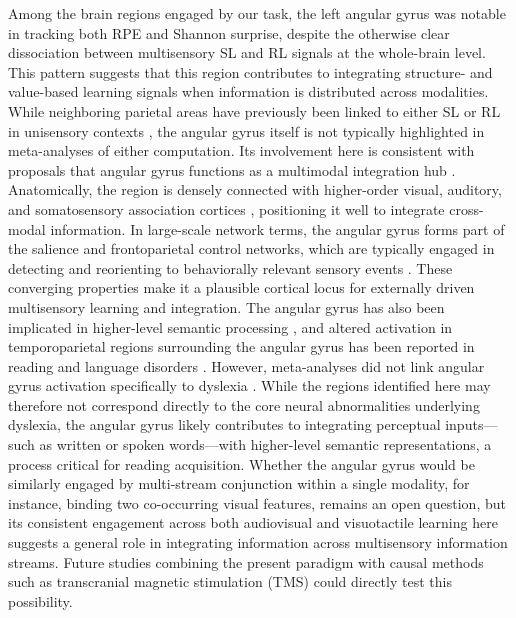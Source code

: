 \documentclass{article}
\begin{document}
Among the brain regions engaged by our task, the left angular gyrus was notable in tracking both RPE and Shannon surprise, despite the otherwise clear dissociation between multisensory SL and RL signals at the whole-brain level. This pattern suggests that this region contributes to integrating structure- and value-based learning signals when information is distributed across modalities. While neighboring parietal areas have previously been linked to either SL or RL in unisensory contexts \cite{visalli2019bayesian, o2013dissociable}, the angular gyrus itself is not typically highlighted in meta-analyses of either computation. Its involvement here is consistent with proposals that angular gyrus functions as a multimodal integration hub \cite{seghier2013angular}. Anatomically, the region is densely connected with higher-order visual, auditory, and somatosensory association cortices \cite{seghier2013angular, song2023functional, rockland2023angular}, positioning it well to integrate cross-modal information. In large-scale network terms, the angular gyrus forms part of the salience and frontoparietal control networks, which are typically engaged in detecting and reorienting to behaviorally relevant sensory events \cite{seghier2013angular}. These converging properties make it a plausible cortical locus for externally driven multisensory learning and integration. The angular gyrus has also been implicated in higher-level semantic processing \cite{binder2011neurobiology, binder2009semantic}, and altered activation in temporoparietal regions surrounding the angular gyrus has been reported in reading and language disorders \cite{di2023disentangling, horwitz1998functional, paz2018neural, gross1991positron}. However, meta-analyses did not link angular gyrus activation specifically to dyslexia \cite{richlan2009functional, richlan2011meta}. While the regions identified here may therefore not correspond directly to the core neural abnormalities underlying dyslexia, the angular gyrus likely contributes to integrating perceptual inputs—such as written or spoken words—with higher-level semantic representations, a process critical for reading acquisition. Whether the angular gyrus would be similarly engaged by multi-stream conjunction within a single modality, for instance, binding two co-occurring visual features, remains an open question, but its consistent engagement across both audiovisual and visuotactile learning here suggests a general role in integrating information across multisensory information streams. Future studies combining the present paradigm with causal methods such as transcranial magnetic stimulation (TMS) could directly test this possibility.\newline
\end{document}
